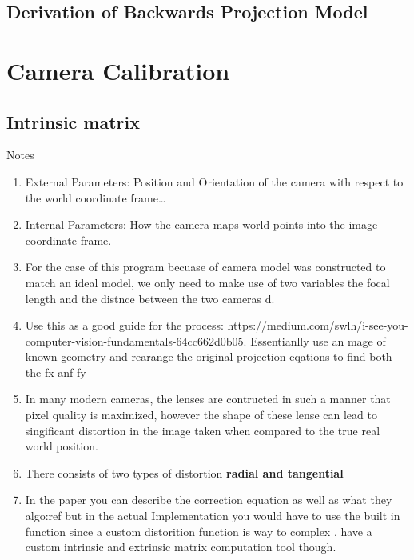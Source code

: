 \documentclass[11pt]{scrartcl}
\begin{document}
\subsection{Derivation of Backwards Projection Model}


\section{Camera Calibration}

\subsection{Intrinsic matrix}
\begin{remark}
    Notes{\begin{enumerate}
        \item  External Parameters: Position and Orientation of the camera with respect to the world coordinate frame\dots
        \item Internal Parameters: How the camera maps world points into the image coordinate frame.
        \item For the case of this program becuase of camera model was constructed to match an ideal model, we only need to make use of two variables the focal length and the distnce between the two cameras d.
        \item Use this as a good guide for the process: https://medium.com/swlh/i-see-you-computer-vision-fundamentals-64cc662d0b05. 
            Essentianlly use an mage of known geometry and rearange the original projection eqations to find both the fx anf fy
        \item In many modern cameras, the lenses are contructed in such a manner that pixel quality is maximized, however the shape of these lense
            can lead to singificant distortion in the image taken when compared to the true real world position. 
        \item There consists of two types of distortion \textbf{radial and tangential} 
        \item In the paper you can describe the correction equation as well as what they algo:ref
            but in the actual Implementation you would have to use the built in function since a custom distorition function is way to complex
            , have a custom intrinsic and extrinsic matrix computation tool though. 
    \end{enumerate}} %
    \label{par:Notes}


\end{remark}
\end{document}
